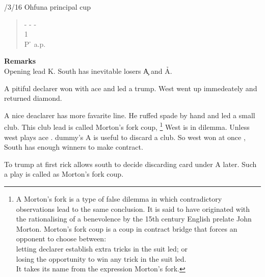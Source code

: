 /3/16 Ohfuna principal cup
\begin{quote}
%
  {}%
  {}
  {}%
  {}%
\end{quote}
\begin{quote}
\begin{bidding}
- \> -  \> - \h  \\
1\s  {}\s {}\s {}\d\\
P \h \> a.p.
\end{bidding}
 \end{quote}

{\bf Remarks}\\

Opening lead \s K.
South has inevitable losers \c A and \h A.

A pitiful declarer won with ace and led a trump.
West went up immedeately and returned diamond.

A nice deaclarer has more favarite line.
He ruffed spade by hand and led a small club.
This club lead is called Morton's fork coup,
\footnote{
A Morton's fork is a type of false dilemma in which contradictory 
observations lead to the same conclusion. It is said to have originated
with the rationalising of a benevolence by the 15th century
 English prelate John Morton.
Morton's fork coup is a coup in contract bridge that forces an opponent 
to choose between:\\
letting declarer establish extra tricks in the suit led; or\\
losing the opportunity to win any trick in the suit led.\\
It takes its name from the expression Morton's fork.}
West is in dilemma.
Unless west plays ace . dummy's \s A is useful to 
discard a club. So west won at once , South has enough winners
to make contract.

To trump at first rick allows south to decide discarding card under 
\s A later. Such a play is called as Morton's fork coup.

